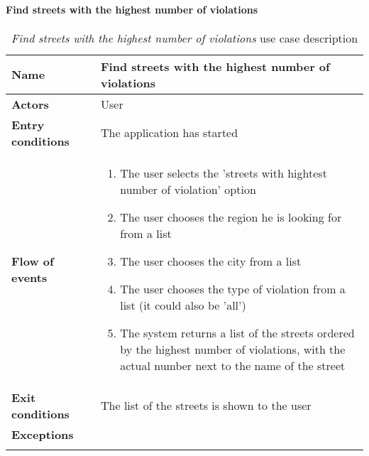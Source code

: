 		\paragraph{Find streets with the highest number of violations}
		
		\begin{longtable}{p{0.25\linewidth}p{0.75\linewidth}}
			\toprule
			\textbf{Name} & \textbf{Find streets with the highest number of violations} \\
			\midrule
			\textbf{Actors} & User \\
			\midrule
			\textbf{Entry conditions} & The application has started \\
			\midrule
			\textbf{Flow of events} & 
			\begin{enumerate}
				\item The user selects the 'streets with hightest number of violation' option
				\item The user chooses the region he is looking for from a list
				\item The user chooses the city from a list
				\item The user chooses the type of violation from a list (it could also be 'all')
				\item The system returns a list of the streets ordered by the highest number of violations, with the actual number next to the name of the street
			\end{enumerate} \\
			\midrule
			\textbf{Exit conditions} & The list of the streets is shown to the user \\
			\midrule
			\textbf{Exceptions} & 
			 \\
			\bottomrule
			\caption{\emph{Find streets with the highest number of violations} use case description}
		\end{longtable}
		
